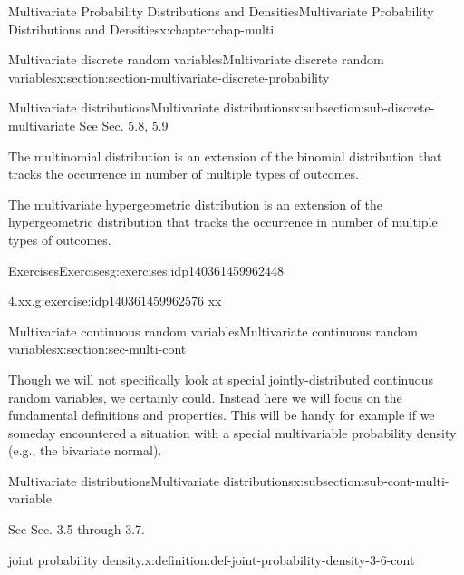 \documentclass[oneside,10pt,]{book}
\numberwithin{equation}{section}
\begin{document}
\begin{chapterptx}{Multivariate Probability Distributions and Densities}{}{Multivariate Probability Distributions and Densities}{}{}{x:chapter:chap-multi}
\begin{sectionptx}{Multivariate discrete random variables}{}{Multivariate discrete random variables}{}{}{x:section:section-multivariate-discrete-probability}
\begin{subsectionptx}{Multivariate distributions}{}{Multivariate distributions}{}{}{x:subsection:sub-discrete-multivariate}
See Sec. 5.8, 5.9%
\begin{introduction}{}%
The multinomial distribution is an extension of the binomial distribution that tracks the occurrence in number of multiple types of outcomes.%
\par
The multivariate hypergeometric distribution is an extension of the hypergeometric distribution that tracks the occurrence in number of multiple types of outcomes.%
\end{introduction}%
\end{subsectionptx}
%
%
\typeout{************************************************}
\typeout{************************************************}
%
\begin{exercises-subsection}{Exercises}{}{Exercises}{}{}{g:exercises:idp140361459962448}
\begin{divisionexercise}{1}{4.xx.}{}{g:exercise:idp140361459962576}%
xx%
\end{divisionexercise}%
\end{exercises-subsection}
\end{sectionptx}
%
%
\typeout{************************************************}
\typeout{************************************************}
%
\begin{sectionptx}{Multivariate continuous random variables}{}{Multivariate continuous random variables}{}{}{x:section:sec-multi-cont}
\begin{introduction}{}%
Though we will not specifically look at special jointly-distributed continuous random variables, we certainly could.  Instead here we will focus on the fundamental definitions and properties.  This will be handy for example if we someday encountered a situation with a special multivariable probability density (e.g., the bivariate normal).%
\end{introduction}%
%
%
\typeout{************************************************}
\typeout{************************************************}
%
\begin{subsectionptx}{Multivariate distributions}{}{Multivariate distributions}{}{}{x:subsection:sub-cont-multi-variable}
\begin{introduction}{}%
See Sec. 3.5 through 3.7.%
\end{introduction}%
\begin{definition}{joint probability density.}{x:definition:def-joint-probability-density-3-6-cont}%

\end{definition}
\end{subsectionptx}
\end{sectionptx}
\end{chapterptx}
\end{document}
